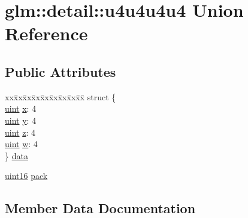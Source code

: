 \hypertarget{unionglm_1_1detail_1_1u4u4u4u4}{}\section{glm\+:\+:detail\+:\+:u4u4u4u4 Union Reference}
\label{unionglm_1_1detail_1_1u4u4u4u4}
\subsection*{Public Attributes}
\begin{DoxyCompactItemize}
\item 
\begin{tabbing}
xx\=xx\=xx\=xx\=xx\=xx\=xx\=xx\=xx\=\kill
struct \{\\
\>\hyperlink{group__core__precision_ga4fd29415871152bfb5abd588334147c8}{uint} \hyperlink{unionglm_1_1detail_1_1u4u4u4u4_a41dd5af8fc599a451d74967a2c97e750}{x}: 4\\
\>\hyperlink{group__core__precision_ga4fd29415871152bfb5abd588334147c8}{uint} \hyperlink{unionglm_1_1detail_1_1u4u4u4u4_a1c5a971d31d261db43863e8e95d81ecb}{y}: 4\\
\>\hyperlink{group__core__precision_ga4fd29415871152bfb5abd588334147c8}{uint} \hyperlink{unionglm_1_1detail_1_1u4u4u4u4_a1635b8d41a367114239565da102ad6b9}{z}: 4\\
\>\hyperlink{group__core__precision_ga4fd29415871152bfb5abd588334147c8}{uint} \hyperlink{unionglm_1_1detail_1_1u4u4u4u4_a7a6644d1d5c02008e670d714d26124af}{w}: 4\\
\} \hyperlink{unionglm_1_1detail_1_1u4u4u4u4_ae3d2d4b0c6a49c3c92981bbb5e658418}{data}\\

\end{tabbing}\item 
\hyperlink{namespaceglm_1_1detail_a47b2a7d006d187338e8031a352d1ce56}{uint16} \hyperlink{unionglm_1_1detail_1_1u4u4u4u4_aa989a8fab51b41be68d0d07147fba3b8}{pack}
\end{DoxyCompactItemize}


\subsection{Member Data Documentation}
\mbox{\label{unionglm_1_1detail_1_1u4u4u4u4_ae3d2d4b0c6a49c3c92981bbb5e658418}} 
